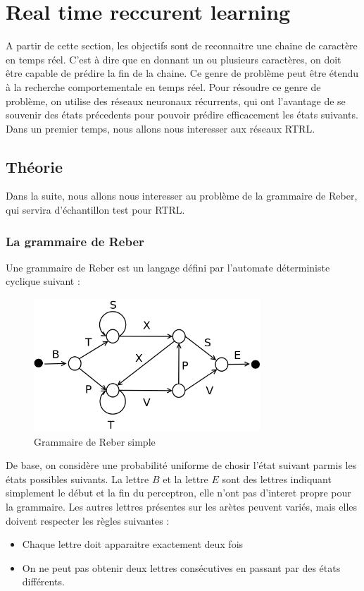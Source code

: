
\chapter{Real time reccurent learning}

A partir de cette section, les objectifs sont de reconnaitre une chaine de caractère en temps réel. C'est à dire que en donnant un ou plusieurs caractères, on doit être capable de prédire la fin de la chaine. Ce genre de problème peut être étendu à la recherche comportementale en temps réel. Pour résoudre ce genre de problème, on utilise des réseaux neuronaux récurrents, qui ont l'avantage de se souvenir des états précedents pour pouvoir prédire efficacement les états suivants. Dans un premier temps, nous allons nous interesser aux réseaux RTRL.

\section{Théorie}

Dans la suite, nous allons nous interesser au problème de la grammaire de Reber, qui servira d'échantillon test pour RTRL.

\subsection{La grammaire de Reber}

 Une grammaire de Reber est un langage défini par l'automate déterministe cyclique suivant :
 
\begin{figure}[!ht]
\begin{center}
\includegraphics[height=5cm]{rtrl/reberGrammar.png}
\end{center}
\caption{Grammaire de Reber simple}
\end{figure}

 
De base, on considère une probabilité uniforme de chosir l'état suivant parmis les états possibles suivants. La lettre $B$ et la lettre $E$ sont des lettres indiquant simplement le début et la fin du perceptron, elle n'ont pas d'interet propre pour la grammaire. Les autres lettres présentes sur les arètes peuvent variés, mais elles doivent respecter les règles suivantes :
\medskip
\begin{itemize}
	\item Chaque lettre doit apparaitre exactement deux fois
	\item On ne peut pas obtenir deux lettres consécutives en passant par des états différents.
\end{itemize}

